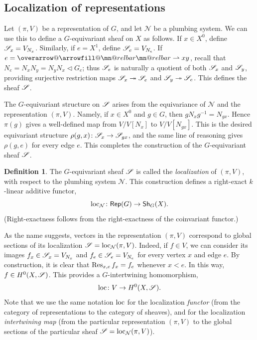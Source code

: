 \documentclass[letter]{amsart}
\makeatletter
\newtheorem{proposition}[thm]{Proposition}
\theoremstyle{definition}
\newtheorem{definition}[thm]{Definition}
\theoremstyle{remark}
\numberwithin{thm}{section}
\numberwithin{equation}{section}
\DeclareRobustCommand{\overrightharpoon}{\mathpalette{\overarrow@\rightharpoonfill@}}
\def\rightharpoonfill@{\arrowfill@\mn@relbar\mn@relbar\rightharpoonup}
\newcommand{\edge}[1]{\overrightharpoon{#1}}
\renewcommand{\NN}{{\mathcal N}}
\newcommand{\ltr}{\triangleleft}
\makeatother
\begin{document}

\subsection{Localization of representations}

Let $(\pi, V)$ be a representation of $G$, and let $\NN$ be a plumbing system.  We can use this to define a $G$-equivariant sheaf on $X$ as follows.  If $x \in X^0$, define ${\mathscr{S}}_x = V_{N_x}$.  Similarly, if $e = X^1$, define ${\mathscr{S}}_e = V_{N_e}$.  If $e = \edge{xy}$, recall that $N_e = N_x N_y = N_y N_x \ltr G_e$; thus ${\mathscr{S}}_e$ is naturally a quotient of both ${\mathscr{S}}_x$ and ${\mathscr{S}}_y$, providing surjective restriction maps ${\mathscr{S}}_x \twoheadrightarrow {\mathscr{S}}_e$ and ${\mathscr{S}}_y \twoheadrightarrow {\mathscr{S}}_e$.  This defines the sheaf ${\mathscr{S}}$.

The $G$-equivariant structure on ${\mathscr{S}}$ arises from the equivariance of $\NN$ and the representation $(\pi, V)$.  Namely, if $x \in X^0$ and $g \in G$, then $g N_x g^{-1} = N_{gx}$.  Hence $\pi(g)$ gives a well-defined map from $V / V[N_x]$ to $V / V[N_{gx}]$.  This is the desired equivariant structure $\rho(g,x) \colon {\mathscr{S}}_x \rightarrow {\mathscr{S}}_{gx}$, and the same line of reasoning gives $\rho(g,e)$ for every edge $e$.  This completes the construction of the $G$-equivariant sheaf ${\mathscr{S}}$.
\begin{definition}
The $G$-equivariant sheaf ${\mathscr{S}}$ is called the {\em localization} of $(\pi, V)$, with respect to the plumbing system $\NN$.  This construction defines a right-exact $k$-linear additive functor,
$$\loc_{\NN} \From \Cat{Rep}(G) \To \Cat{Sh}_G(X).$$
(Right-exactness follows from the right-exactness of the coinvariant functor.)
\end{definition}

As the name suggests, vectors in the representation $(\pi, V)$ correspond to global sections of its localization $\sheaf{S} = \loc_{\NN}(\pi, V)$.  Indeed, if $f \in V$, we can consider its images $f_x \in {\mathscr{S}}_x = V_{N_x}$ and $f_e \in {\mathscr{S}}_e = V_{N_e}$ for every vertex $x$ and edge $e$.  By construction, it is clear that $\operatorname{Res}_{x,e} f_x = f_e$ whenever $x < e$.  In this way, $f \in H^0(X, {\mathscr{S}})$.  This provides a $G$-intertwining homomorphism,
$$\operatorname{loc} \colon V \rightarrow H^0(X, {\mathscr{S}}).$$
Note that we use the same notation $\operatorname{loc}$ for the localization {\em functor} (from the category of representations to the category of sheaves), and for the localization {\em intertwining map} (from the particular representation $(\pi, V)$ to the global sections of the particular sheaf $\sheaf{S} = \loc_\NN(\pi, V)$).
\end{document}
